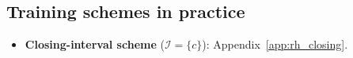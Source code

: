 \subsection{Training schemes in practice}
\label{sec:rh_exp_schemes}
\begin{itemize}
\item \textbf{Closing-interval scheme} ($\mathcal I = \{c\}$): Appendix~\ref{app:rh_closing}.

\end{itemize}

